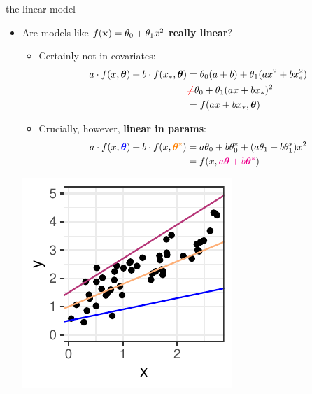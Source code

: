 \documentclass[11pt,compress,t,notes=noshow, xcolor=table]{beamer}
\begin{document}
\begin{vbframe}{the linear model}

\begin{itemize}
\item Are models like $f(\mathbf{x}) = \theta_0 + \theta_1 x^2$
  \textbf{really linear}?
\begin{minipage}[b]{0.7\textwidth}
  \vspace{0.3cm}
  \begin{itemize}
    \item Certainly not in covariates:
    \scriptsize
    \begin{align*}
      a \cdot f(x, \bm{\theta}) + b \cdot f(x_\ast, \bm{\theta})
      &= \theta_0 (a + b) + \theta_1(a x^2 + b x_\ast^2) \\
      &\textcolor{red}{\neq} \theta_0 + \theta_1 (a x + b  x_\ast)^2\\
      &= f(a  x + b x_\ast, \bm{\theta})
    \end{align*}
    \normalsize
    \item Crucially, however, \textbf{linear in params}:
    \scriptsize
    \begin{align*}
      a \cdot f(x, \textcolor{blue}{\bm{\theta}}) +
      b \cdot f(x, \textcolor{orange}{\bm{\theta}^\ast})
      &= a \theta_0 + b \theta_0^\ast + (a \theta_1 + b \theta_1^\ast) x^2 \\
      &= f(x, \textcolor{magenta}{a \bm{\theta} + b \bm{\theta}^\ast})
    \end{align*}
  \end{itemize}
\end{minipage}
\begin{minipage}[b]{0.2\textwidth}
  \includegraphics[width=\textwidth]{figure/reg_poly_linearity}

\end{minipage}
\end{itemize}
\end{vbframe}
\end{document}
